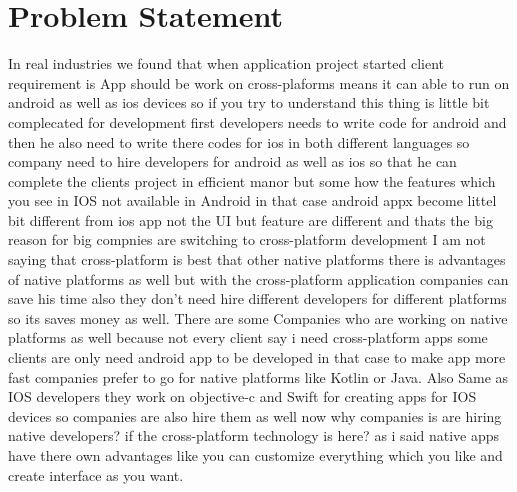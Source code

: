 \documentclass[12pt,a4paper]{report}
\begin{document}
\section{Problem Statement}
 In real industries we found that when application project started client requirement is App should be work on cross-plaforms means it can able to run on android as well as ios devices so if you try to understand this thing is little bit complecated for development first developers needs to write code for android and then he also need to write there codes for ios in both different languages so company need to hire developers for android as well as ios so that he can complete the clients project in efficient manor but some how the features which you see in IOS not available in Android in that case android appx become littel bit different from ios app not the UI but feature are different and thats the big reason for big compnies are switching to cross-platform development I am not saying that cross-platform is best that other native platforms there is advantages  of native platforms as well but with the cross-platform application companies can save his time also they don't need hire different developers for different platforms so its saves money as well. There are some Companies who are working on native platforms as well because not every client say i need cross-platform apps some clients are only need android app to be developed in that case to make app more fast companies prefer to go for native platforms like Kotlin or Java. Also Same as IOS developers they work on objective-c and Swift for creating apps for IOS devices so companies are also hire them as well now why companies is are hiring native developers? if the cross-platform technology is here? as i said native apps have there own advantages like you can customize everything which you like and create interface as you want.

\newpage
\end{document}
